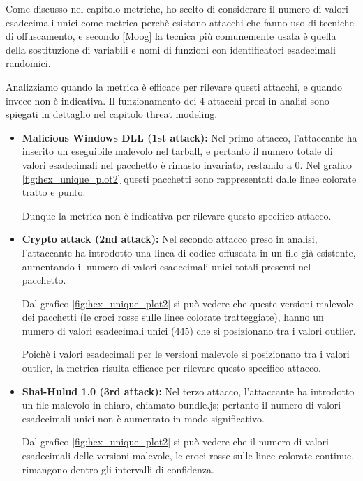 Come discusso nel capitolo metriche, ho scelto di considerare il numero di valori esadecimali unici come metrica 
perchè esistono attacchi che fanno uso di tecniche di offuscamento,
e secondo [Moog] la tecnica più comunemente usata 
è quella della sostituzione di variabili e nomi di funzioni con identificatori esadecimali randomici.

Analizziamo quando la metrica è efficace per rilevare questi attacchi, e quando invece non è indicativa.
Il funzionamento dei 4 attacchi presi in analisi sono spiegati in dettaglio nel capitolo threat modeling.

\begin{itemize}
    \item \textbf{Malicious Windows DLL (1st attack):}
        Nel primo attacco, l'attaccante ha inserito un eseguibile malevolo nel tarball,
        e pertanto il numero totale di valori esadecimali nel pacchetto è rimasto invariato, restando a 0.
        Nel grafico \ref{fig:hex_unique_plot2} questi pacchetti sono 
        rappresentati dalle linee colorate tratto e punto.

        Dunque la metrica non è indicativa per rilevare questo specifico attacco.

    \item \textbf{Crypto attack (2nd attack):}
        Nel secondo attacco preso in analisi, l'attaccante ha introdotto una linea di codice 
        offuscata in un file già esistente, aumentando il numero di valori esadecimali unici totali presenti nel pacchetto.
        
        Dal grafico \ref{fig:hex_unique_plot2} si può vedere che 
        queste versioni malevole dei pacchetti (le croci rosse sulle linee colorate tratteggiate),
        hanno un numero di valori esadecimali unici (445) che
        si posizionano tra i valori outlier.
        
        Poichè i valori esadecimali per le versioni malevole si posizionano tra i valori outlier,
        la metrica risulta efficace per rilevare questo specifico attacco.
    
    \item \textbf{Shai-Hulud 1.0 (3rd attack):}   
        Nel terzo attacco, l'attaccante ha introdotto un file malevolo in chiaro, chiamato bundle.js;
        pertanto il numero di valori esadecimali unici non è aumentato in modo significativo.
        
        Dal grafico \ref{fig:hex_unique_plot2} si può vedere che
        il numero di valori esadecimali delle versioni malevole, le croci rosse sulle linee colorate continue, 
        rimangono dentro gli intervalli di confidenza.
        

\end{itemize}
